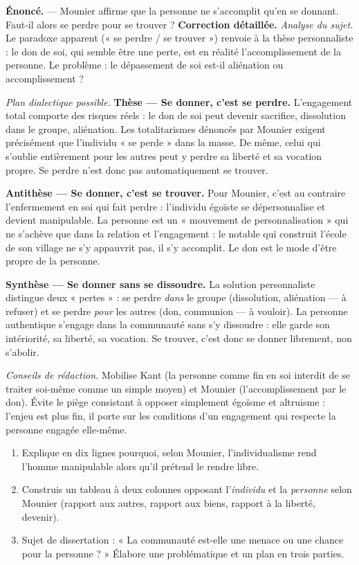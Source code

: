 \documentclass[11pt]{article}
\begin{document}
\begin{exoresolu}
\textbf{Énoncé.} — Mounier affirme que la personne ne s'accomplit qu'en se donnant. Faut-il alors se perdre pour se trouver ?
\tcblower
\textbf{Correction détaillée.}
\emph{Analyse du sujet.} Le paradoxe apparent (« se perdre / se trouver ») renvoie à la thèse personnaliste : le don de soi, qui semble être une perte, est en réalité l'accomplissement de la personne. Le problème : le dépassement de soi est-il aliénation ou accomplissement ?

\emph{Plan dialectique possible.}
\textbf{Thèse — Se donner, c'est se perdre.} L'engagement total comporte des risques réels : le don de soi peut devenir sacrifice, dissolution dans le groupe, aliénation. Les totalitarismes dénoncés par Mounier exigent précisément que l'individu « se perde » dans la masse. De même, celui qui s'oublie entièrement pour les autres peut y perdre sa liberté et sa vocation propre. Se perdre n'est donc pas automatiquement se trouver.

\textbf{Antithèse — Se donner, c'est se trouver.} Pour Mounier, c'est au contraire l'enfermement en soi qui fait perdre : l'individu égoïste se dépersonnalise et devient manipulable. La personne est un « mouvement de personnalisation » qui ne s'achève que dans la relation et l'engagement : le notable qui construit l'école de son village ne s'y appauvrit pas, il s'y accomplit. Le don est le mode d'être propre de la personne.

\textbf{Synthèse — Se donner sans se dissoudre.} La solution personnaliste distingue deux « pertes » : se perdre \emph{dans} le groupe (dissolution, aliénation — à refuser) et se perdre \emph{pour} les autres (don, communion — à vouloir). La personne authentique s'engage dans la communauté sans s'y dissoudre : elle garde son intériorité, sa liberté, sa vocation. Se trouver, c'est donc se donner librement, non s'abolir.

\emph{Conseils de rédaction.} Mobilise Kant (la personne comme fin en soi interdit de se traiter soi-même comme un simple moyen) et Mounier (l'accomplissement par le don). Évite le piège consistant à opposer simplement égoïsme et altruisme : l'enjeu est plus fin, il porte sur les conditions d'un engagement qui respecte la personne engagée elle-même.
\end{exoresolu}

\begin{exercice}
\begin{enumerate}
\item Explique en dix lignes pourquoi, selon Mounier, l'individualisme rend l'homme manipulable alors qu'il prétend le rendre libre.
\item Construis un tableau à deux colonnes opposant l'\emph{individu} et la \emph{personne} selon Mounier (rapport aux autres, rapport aux biens, rapport à la liberté, devenir).
\item Sujet de dissertation : « La communauté est-elle une menace ou une chance pour la personne ? » Élabore une problématique et un plan en trois parties.
\end{enumerate}
\end{exercice}
\end{document}
